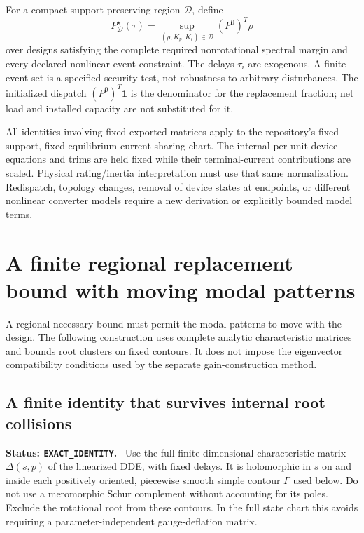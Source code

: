 \documentclass[11pt]{article}
\newcommand{\status}[1]{\par\smallskip\noindent\textbf{Status: \texttt{#1}.}\ }
\begin{document}
For a compact support-preserving region $\mathcal D$, define
\[
 P^\star_{\mathcal D}(\tau)=
 \sup_{(\rho,K_p,K_i)\in\mathcal D}
 (P^0)^T\rho
\]
over designs satisfying the complete required nonrotational spectral
margin and every declared nonlinear-event constraint.
The delays $\tau_i$ are exogenous. A finite event set is a specified
security test, not robustness to arbitrary disturbances.
The initialized dispatch $(P^0)^T\mathbf1$ is the denominator for
the replacement fraction; net load and installed capacity are not
substituted for it.

All identities involving fixed exported matrices apply to the
repository's fixed-support, fixed-equilibrium current-sharing chart.
The internal per-unit device equations and trims are held fixed
while their terminal-current contributions are scaled. Physical
rating/inertia interpretation must use that same normalization.
Redispatch, topology changes, removal of device states at endpoints,
or different nonlinear converter models require a new derivation
or explicitly bounded model terms.
\section{A finite regional replacement bound with moving modal patterns}
\label{sec:regional}

A regional necessary bound must permit the modal patterns to move
with the design. The following construction uses complete analytic
characteristic matrices and bounds root clusters on fixed contours.
It does not impose the eigenvector compatibility conditions used
by the separate gain-construction method.

\subsection{A finite identity that survives internal root collisions}
\status{EXACT\_IDENTITY}
Use the full finite-dimensional characteristic matrix
$\Delta(s,p)$ of the linearized DDE, with fixed delays.
It is holomorphic in $s$ on and inside each positively oriented,
piecewise smooth simple contour $\Gamma$ used below.
Do not use a meromorphic Schur complement without accounting for its poles.
Exclude the rotational root from these contours. In the full state chart
this avoids requiring a parameter-independent gauge-deflation matrix.
\end{document}
